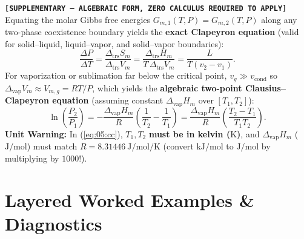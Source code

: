 \begin{suppbox}
\textbf{\texttt{[SUPPLEMENTARY --- ALGEBRAIC FORM, ZERO CALCULUS REQUIRED TO APPLY]}}\\
Equating the molar Gibbs free energies $G_{m,1}(T,P) = G_{m,2}(T,P)$ along any two-phase coexistence boundary yields the \textbf{exact Clapeyron equation} (valid for solid--liquid, liquid--vapor, and solid--vapor boundaries):
\begin{equation}\label{eq:05:clapeyron}
  \frac{\Delta P}{\Delta T} = \frac{\Delta_{\mathrm{trs}}S_m}{\Delta_{\mathrm{trs}}V_m} = \frac{\Delta_{\mathrm{trs}}H_m}{T\,\Delta_{\mathrm{trs}}V_m} = \frac{L}{T(v_2 - v_1)}.
\end{equation}
For vaporization or sublimation far below the critical point, $v_g \gg v_{\mathrm{cond}}$ so $\Delta_{\mathrm{vap}}V_m \approx V_{m,g} = RT/P$, which yields the \textbf{algebraic two-point Clausius--Clapeyron equation} (assuming constant $\Delta_{\mathrm{vap}}H_m$ over $[T_1, T_2]$):
\begin{equation}\label{eq:05:cc}
  \ln\!\left(\frac{P_2}{P_1}\right) = -\frac{\Delta_{\mathrm{vap}}H_m}{R}\left(\frac{1}{T_2} - \frac{1}{T_1}\right) = \frac{\Delta_{\mathrm{vap}}H_m}{R}\left(\frac{T_2 - T_1}{T_1 T_2}\right).
\end{equation}
\textbf{Unit Warning:} In (\ref{eq:05:cc}), $T_1, T_2$ \textbf{must be in kelvin ($\si{\kelvin}$)}, and $\Delta_{\mathrm{vap}}H_m$ ($\si{\joule\per\mole}$) must match $R = \SI{8.31446}{\joule\per\mole\per\kelvin}$ (convert $\si{\kilo\joule\per\mole}$ to $\si{\joule\per\mole}$ by multiplying by $1000$!).
\end{suppbox}

\section{Layered Worked Examples \& Diagnostics}
\label{sec:05.6}

